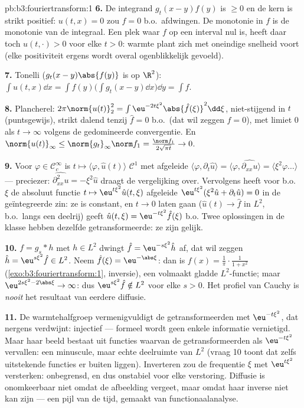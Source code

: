 \begin{solution}{pb:b3:fouriertransform:1}
\textbf{6.} De integrand $g_t(x-y)f(y)$ is $\geq 0$ en de kern is
strikt positief: $u(t,x) = 0$ zou $f = 0$ b.o.\ afdwingen. De
monotonie in $f$ is de monotonie van de integraal. Een plek waar
$f$ op een interval nul is, heeft daar toch $u(t, \cdot) > 0$
voor elke $t > 0$: warmte plant zich met oneindige snelheid voort
(elke positiviteit ergens wordt overal ogenblikkelijk gevoeld).

\textbf{7.} Tonelli ($g_t(x-y)\abs{f(y)}$ is  op
$\R^2$): $\int u(t,x)\dd x = \int f(y)\bigl(\int g_t(x - y)\dd
x\bigr)\dd y = \int f$.

\textbf{8.} Plancherel: $2\pi\norm{u(t)}_2^2 =
\int\eu^{-2t\xi^2}\abs{\hat f(\xi)}^2\dd\xi$, niet-stijgend in
$t$ (puntsgewijs), strikt dalend tenzij $\hat f = 0$ b.o.\ (dat
wil zeggen $f = 0$), met limiet $0$ als $t\to\infty$ volgens de
gedomineerde convergentie. En $\norm{u(t)}_\infty \leq
\norm{g_t}_\infty\norm f_1 = \frac{\norm f_1}{2\sqrt{\pi t}} \to
0$.

\textbf{9.} Voor $\varphi \in \mathcal C_c^\infty$ is $t \mapsto
\langle\varphi, \hat u(t)\rangle$ $\mathcal C^1$ met afgeleide
$\langle\varphi, \partial_t\hat u\rangle = \langle\varphi,
\widehat{\partial_{xx}u}\rangle = \langle\xi^2\varphi\dots\rangle$
--- preciezer: $\widehat{\partial^2_{xx}u} = -\xi^2\hat u$ draagt
de vergelijking over. Vervolgens heeft voor b.o.\ $\xi$ de
absoluut  functie $t \mapsto \eu^{t\xi^2}\hat u(t,\xi)$
afgeleide $\eu^{t\xi^2}(\xi^2\hat u + \partial_t\hat u) = 0$ in
de geïntegreerde zin: ze is constant, en $t \to 0$ laten gaan
($\hat u(t) \to \hat f$ in $L^2$, b.o.\ langs een deelrij) geeft
$\hat u(t, \xi) = \eu^{-t\xi^2}\hat f(\xi)$ b.o. Twee oplossingen
in de klasse hebben dezelfde getransformeerde: ze zijn gelijk.

\textbf{10.} $f = g_s * h$ met $h \in L^2$ dwingt $\hat f =
\eu^{-s\xi^2}\hat h$ af, dat wil zeggen $\hat h =
\eu^{s\xi^2}\hat f \in L^2$. Neem $\hat f(\xi) = \eu^{-\abs\xi}$:
dan is $f(x) = \frac1\pi\cdot\frac1{1 + x^2}$
(\cref{exo:b3:fouriertransform:1}, inversie), een volmaakt gladde
$L^2$-functie; maar $\eu^{2s\xi^2 - 2\abs\xi} \to \infty$: dus
$\eu^{s\xi^2}\hat f \notin L^2$ voor elke $s > 0$. Het profiel
van Cauchy is \emph{nooit} het resultaat van eerdere diffusie.

\textbf{11.} De warmtehalfgroep vermenigvuldigt de
getransformeerden met $\eu^{-t\xi^2}$, dat nergens verdwijnt:
injectief --- formeel wordt geen enkele informatie vernietigd.
Maar haar beeld bestaat uit functies waarvan de getransformeerden
als $\eu^{-t\xi^2}$ vervallen: een minuscule,  maar echte
deelruimte van $L^2$ (vraag 10 toont dat zelfs uitstekende
functies er buiten liggen). Inverteren zou de frequentie $\xi$
met $\eu^{t\xi^2}$ versterken: onbegrensd, en dus onstabiel voor
elke verstoring. Diffusie is onomkeerbaar niet omdat de
afbeelding vergeet, maar omdat haar inverse niet  kan zijn
--- een pijl van de tijd, gemaakt van functionaalanalyse.


\end{solution}
